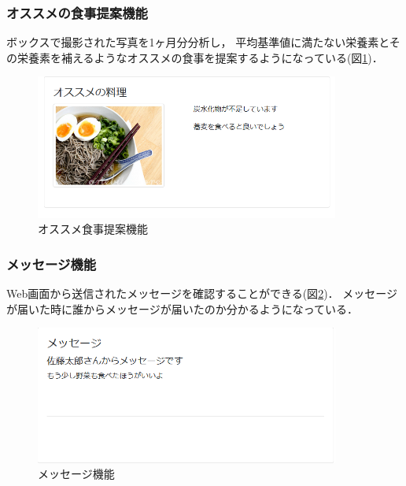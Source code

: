\documentclass[../report]{subfiles}
\begin{document}
\subsubsection{オススメの食事提案機能}
ボックスで撮影された写真を1ヶ月分分析し， 平均基準値に満たない栄養素とその栄養素を補えるようなオススメの食事を提案するようになっている(図\ref{fig:5_tv-suggestion})．

\begin{figure}[htbp]
    \begin{center}
        \includegraphics[width=10cm]{imgs/5_tv2.png}
        \caption{オススメ食事提案機能}
        \label{fig:5_tv-suggestion}
    \end{center}
\end{figure}

\subsubsection{メッセージ機能}
Web画面から送信されたメッセージを確認することができる(図\ref{fig:5_tv-message})．
メッセージが届いた時に誰からメッセージが届いたのか分かるようになっている．

\begin{figure}[htbp]
    \begin{center}
        \includegraphics[width=10cm]{imgs/5_message.png}
        \caption{メッセージ機能}
        \label{fig:5_tv-message}
    \end{center}
\end{figure}
\end{document}
